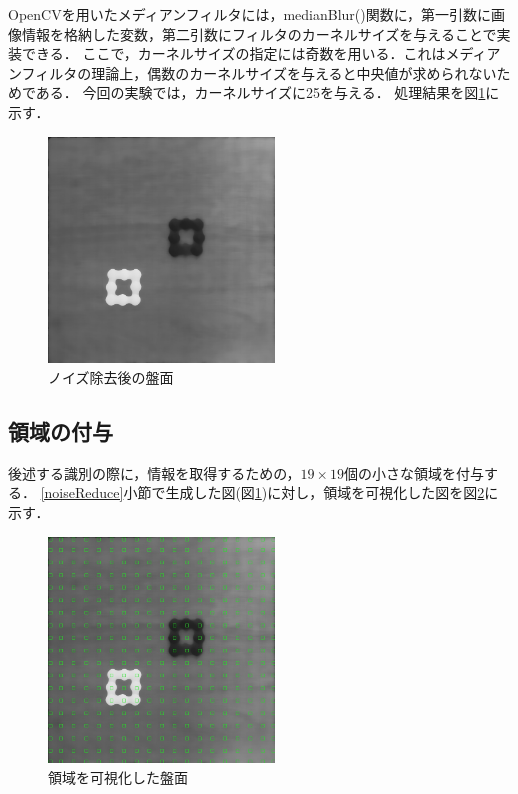 \documentclass[openright]{nitocs}
\numberwithin{equation}{section}
\begin{document}
            OpenCVを用いたメディアンフィルタには，medianBlur()関数に，第一引数に画像情報を格納した変数，第二引数にフィルタのカーネルサイズを与えることで実装できる．
            ここで，カーネルサイズの指定には奇数を用いる．これはメディアンフィルタの理論上，偶数のカーネルサイズを与えると中央値が求められないためである．
            今回の実験では，カーネルサイズに25を与える．
            処理結果を図\ref{noiseReducedImg}に示す．
            \begin{figure}[tb] %
                \begin{center}
                \includegraphics[clip,width=60mm]{noiseReducedImg.jpg} 
                \caption{ノイズ除去後の盤面}
                \label{noiseReducedImg}
                \end{center}
            \end{figure}

        \subsection{領域の付与}
            \label{area}
            後述する識別の際に，情報を取得するための，$19\times19$個の小さな領域を付与する．
            \ref{noiseReduce}小節で生成した図(図\ref{noiseReducedImg})に対し，領域を可視化した図を図\ref{boardWithArea}に示す．
            \begin{figure}[tb] %
                \begin{center}
                \includegraphics[clip,width=60mm]{boardWithAreaImg.jpg} 
                \caption{領域を可視化した盤面}
                \label{boardWithArea}
                \end{center}
            \end{figure}
\end{document}
